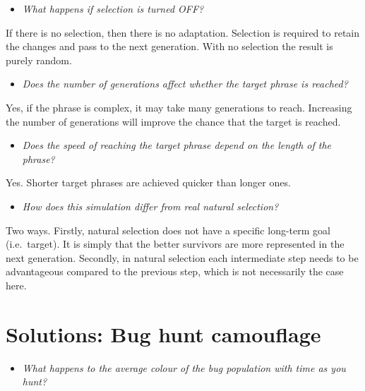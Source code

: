 \documentclass[
  a4paper]{book}
\providecommand{\tightlist}{%
  \setlength{\itemsep}{0pt}\setlength{\parskip}{0pt}}
\begin{document}
\begin{itemize}
\tightlist
\item
  \emph{What happens if selection is turned OFF?}
\end{itemize}

If there is no selection, then there is no adaptation. Selection is required to retain the changes and pass to the next generation. With no selection the result is purely random.

\begin{itemize}
\tightlist
\item
  \emph{Does the number of generations affect whether the target phrase is reached?}
\end{itemize}

Yes, if the phrase is complex, it may take many generations to reach. Increasing the number of generations will improve the chance that the target is reached.

\begin{itemize}
\tightlist
\item
  \emph{Does the speed of reaching the target phrase depend on the length of the phrase?}
\end{itemize}

Yes. Shorter target phrases are achieved quicker than longer ones.

\begin{itemize}
\tightlist
\item
  \emph{How does this simulation differ from real natural selection?}
\end{itemize}

Two ways. Firstly, natural selection does not have a specific long-term goal (i.e.~target). It is simply that the better survivors are more represented in the next generation. Secondly, in natural selection each intermediate step needs to be advantageous compared to the previous step, which is not necessarily the case here.

\hypertarget{solutions-bug-hunt-camouflage}{%
\section{Solutions: Bug hunt camouflage}\label{solutions-bug-hunt-camouflage}}

\begin{itemize}
\tightlist
\item
  \emph{What happens to the average colour of the bug population with time as you hunt?}
\end{itemize}
\end{document}
